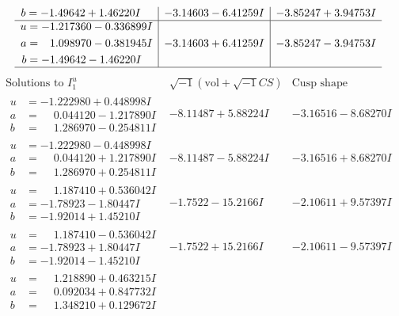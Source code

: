 \documentclass[1p]{elsarticle_modified}
\theoremstyle{definition}
\newcommand{\I}{\sqrt{-1}}
\begin{document}
$$\begin{array}{c|c|c}
\begin{aligned}
b &= -1.49642 + 1.46220 I\end{aligned}
 & -3.14603 - 6.41259 I & -3.85247 + 3.94753 I \\ \hline\begin{aligned}
u &= -1.217360 - 0.336899 I \\
a &= \phantom{-}1.098970 - 0.381945 I \\
b &= -1.49642 - 1.46220 I\end{aligned}
 & -3.14603 + 6.41259 I & -3.85247 - 3.94753 I\\
 \hline 
 \end{array}$$\newpage$$\begin{array}{c|c|c}  
\text{Solutions to }I^u_{1}& \I (\text{vol} + \sqrt{-1}CS) & \text{Cusp shape}\\
 \hline 
\begin{aligned}
u &= -1.222980 + 0.448998 I \\
a &= \phantom{-}0.044120 - 1.217890 I \\
b &= \phantom{-}1.286970 - 0.254811 I\end{aligned}
 & -8.11487 + 5.88224 I & -3.16516 - 8.68270 I \\ \hline\begin{aligned}
u &= -1.222980 - 0.448998 I \\
a &= \phantom{-}0.044120 + 1.217890 I \\
b &= \phantom{-}1.286970 + 0.254811 I\end{aligned}
 & -8.11487 - 5.88224 I & -3.16516 + 8.68270 I \\ \hline\begin{aligned}
u &= \phantom{-}1.187410 + 0.536042 I \\
a &= -1.78923 - 1.80447 I \\
b &= -1.92014 + 1.45210 I\end{aligned}
 & -1.7522 - 15.2166 I & -2.10611 + 9.57397 I \\ \hline\begin{aligned}
u &= \phantom{-}1.187410 - 0.536042 I \\
a &= -1.78923 + 1.80447 I \\
b &= -1.92014 - 1.45210 I\end{aligned}
 & -1.7522 + 15.2166 I & -2.10611 - 9.57397 I \\ \hline\begin{aligned}
u &= \phantom{-}1.218890 + 0.463215 I \\
a &= \phantom{-}0.092034 + 0.847732 I \\
b &= \phantom{-}1.348210 + 0.129672 I\end{aligned}

\end{array}$$
\end{document}

